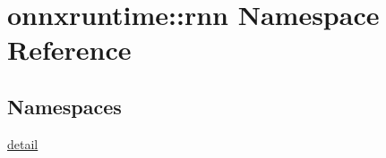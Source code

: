 \hypertarget{namespaceonnxruntime_1_1rnn}{}\section{onnxruntime\+:\+:rnn Namespace Reference}
\label{namespaceonnxruntime_1_1rnn}
\subsection*{Namespaces}
\begin{DoxyCompactItemize}
\item 
 \mbox{\hyperlink{namespaceonnxruntime_1_1rnn_1_1detail}{detail}}
\end{DoxyCompactItemize}
